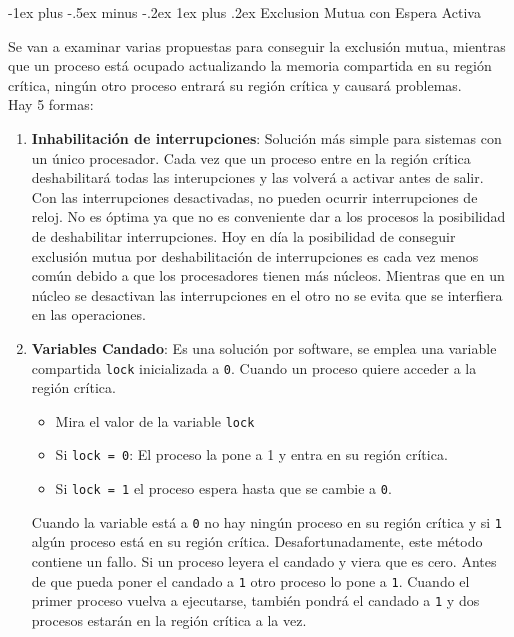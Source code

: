 \documentclass[10pt,portrait, twocolumn]{article}
\makeatletter
\renewcommand{\subsubsection}{\@startsection{subsubsection}{3}{0mm}%
                                {-1ex plus -.5ex minus -.2ex}%
                                {1ex plus .2ex}%
                                {\normalfont\small\bfseries}}
\makeatother
\begin{document}
\subsubsection{Exclusion Mutua con Espera Activa}

Se van a examinar varias propuestas para conseguir la exclusión mutua, mientras que un proceso está ocupado actualizando la memoria compartida en su región crítica, ningún otro proceso entrará su región crítica y causará problemas.\\

Hay 5 formas:

	\begin{enumerate}
		\item \textbf{Inhabilitación de interrupciones}: Solución más simple para sistemas con un único procesador. Cada vez que un proceso entre en la región crítica deshabilitará todas las interupciones y las volverá a activar antes de salir. Con las interrupciones desactivadas, no pueden ocurrir interrupciones de reloj.  No es óptima ya que no es conveniente dar a los procesos la posibilidad de deshabilitar interrupciones. Hoy en día la posibilidad de conseguir exclusión mutua por deshabilitación de interrupciones es cada vez menos común debido a que los procesadores tienen más núcleos. Mientras que en un núcleo se desactivan las interrupciones en el otro no se evita que se interfiera en las operaciones.
		\item \textbf{Variables Candado}: Es una solución por software, se emplea una variable compartida \texttt{lock} inicializada a \texttt{0}. Cuando un proceso quiere acceder a la región crítica.
			\begin{itemize}
			\item Mira el valor de la variable \texttt{lock}
			\item Si \texttt{lock = 0}: El proceso la pone a 1 y entra en su región crítica.
			\item Si \texttt{lock = 1} el proceso espera hasta que se cambie a \texttt{0}.
			\end{itemize}
			
			Cuando la variable está a \texttt{0} no hay ningún proceso en su región crítica y si \texttt{1} algún proceso está en su región crítica. Desafortunadamente, este método contiene un fallo. Si un proceso leyera el candado y viera que es cero. Antes de que pueda poner el candado a \texttt{1} otro proceso lo pone a \texttt{1}. Cuando el primer proceso vuelva a ejecutarse, también pondrá el candado a \texttt{1}  y dos procesos estarán en la región crítica a la vez.
			

\end{enumerate}
\end{document}
